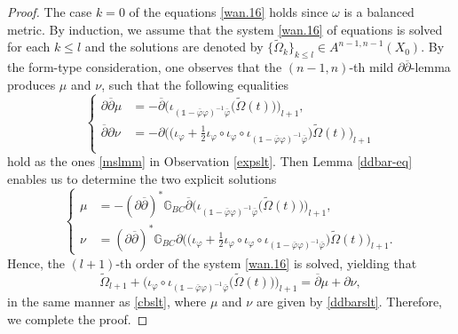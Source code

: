 \documentclass[12pt]{amsart}
\numberwithin{equation}{section}
\renewcommand{\1}{\mathds{1}}
\newcommand{\G}{\mathbb{G}}
\newcommand{\db}{\overline{\partial}}
\newcommand{\beq}{\begin{equation}}
\newcommand{\eeq}{\end{equation}}
\renewcommand{\>}{\rightarrow}
\newcommand{\p}{\partial}
\def\p{\partial}
\def\b{\bar}
\begin{document}
\begin{proof}
The case $k=0$ of the equations \eqref{wan.16} holds since $\omega$
is a balanced metric. By induction, we assume that the system
\eqref{wan.16} of equations is solved for each $k\leq l$ and the
solutions are denoted by $\{\tilde{\Omega}_k\}_{k\leq l}\in
A^{n-1,n-1}(X_0)$. By the form-type consideration, one observes
that the $(n-1,n)$-th mild $\p\db$-lemma produces $\mu$ and $\nu$,
such that the following equalities
\[ \left\{ \begin{aligned}
\p \db \mu &= -\db  \Big( \iota_{(\1-\b{\varphi}\varphi)^{-1}\b{\varphi}} \big( \tilde{\Omega}(t) \big) \Big)_{l+1},\\
\db \p \nu &= -\p \Big( \big( \iota_{\varphi}+ \frac{1}{2}
\iota_{\varphi}\circ \iota_{\varphi}\circ
\iota_{(\1-\b{\varphi}\varphi)^{-1}\b{\varphi}}\big)\tilde{\Omega}(t) \Big)_{l+1} \\
\end{aligned} \right. \]
hold as the ones \eqref{mslmm} in Observation \ref{expslt}. Then
Lemma \ref{ddbar-eq} enables us to determine the two explicit
solutions \beq\label{ddbarslt} \left\{ \begin{aligned}
\mu &= - (\p\db)^* \G_{BC} \db  \Big( \iota_{(\1-\b{\varphi}\varphi)^{-1}\b{\varphi}} \big( \tilde{\Omega}(t) \big) \Big)_{l+1}, \\
\nu &= (\p\db)^* \G_{BC} \p \Big( \big( \iota_{\varphi}+ \frac{1}{2}
\iota_{\varphi}\circ \iota_{\varphi}\circ
\iota_{(\1-\b{\varphi}\varphi)^{-1}\b{\varphi}}\big)\tilde{\Omega}(t)
\Big)_{l+1}.
\end{aligned} \right. \eeq
Hence, the $(l+1)$-th order of the system \eqref{wan.16} is solved,
yielding that
\[\tilde{\Omega}_{l+1} + \Big( \iota_{\varphi}\circ \iota_{(\1-\b{\varphi}\varphi)^{-1}\b{\varphi}} \big( \tilde{\Omega}(t)\big) \Big)_{l+1} =
\db \mu + \p \nu,\] in the same manner as \eqref{cbslt}, where $\mu$
and $\nu$ are given by \eqref{ddbarslt}. Therefore, we complete the
proof.
\end{proof}
\end{document}
